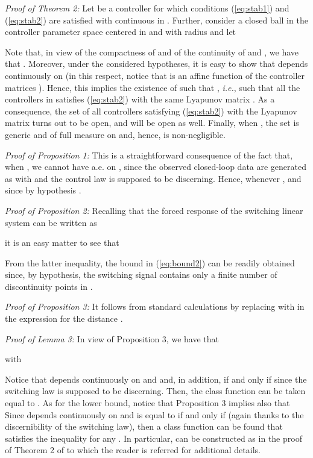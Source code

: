 \documentclass[letterpaper, 10 pt, conference]{ieeetran}
\def\qedp{\hspace*{\fill}~{\tiny }}
\begin{document}
{\em Proof of Theorem 2:} 
Let  be a controller for which conditions (\ref{eq:stab1}) and (\ref{eq:stab2}) are satisfied with  continuous in . 
Further, consider a closed ball  in the controller parameter space  centered in  and with radius 
and let 

Note that, in view of the compactness of   and of the continuity of  and , we have that . Moreover, under the considered hypotheses, it is easy to show that 
 depends continuously on  (in this respect, notice that 
 is an affine function of the controller matrices ).
Hence, this implies  the existence of  such that , 
\emph{i.e.}, such that  all the controllers in  satisfies 
(\ref{eq:stab2}) with the same Lyapunov matrix . As a consequence, the set 
 of all controllers satisfying (\ref{eq:stab2})  with the 
Lyapunov matrix  turns out to be open, and  will be open as well. Finally, when , the set  is generic and
of full measure on  and, hence,  is non-negligible.
\qedp

{\em Proof of Proposition 1:} This  is a straightforward consequence of the fact that, when , we cannot have 
 a.e. on , since the 
observed closed-loop data are generated as  with 
and the control law  is supposed to be discerning. Hence,  whenever
, and  since by hypothesis .
\qedp

{\em Proof of Proposition 2:}
Recalling that the forced response  of the switching linear system  can be written
as

it is an easy matter to see that 

From the latter inequality, the bound in (\ref{eq:bound2}) can be readily obtained since, by hypothesis, the switching signal  contains only a finite number of discontinuity points in .
\qedp

{\em Proof of Proposition 3:} It follows from standard calculations by replacing  with  in the expression for the distance . \qedp

{\em Proof of Lemma 3:} 
In view of Proposition 3, we have that

with

Notice that   depends continuously on  and  and, in addition, 
if and only if  since the switching law is supposed to be discerning. Then,
the class  function  can be taken equal to .
As for the lower bound, notice that Proposition 3 implies also that
{\setlength\arraycolsep{1pt}
}Since  depends continuously on  and is equal to  if and only if
 (again thanks to the discernibility of the switching law), then a class  function  can be found
that satisfies the inequality  for any .
In particular,  can be constructed as in the proof of Theorem 2 of \cite{AlBaBaTAC} to which the reader is referred for additional details.
\qedp
\end{document}
